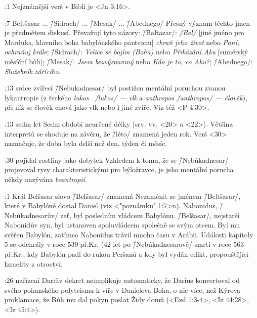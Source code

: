 

:1 {} Nejznámější verš v Bibli je <Jn 3:16>.  

:7  {Beltšasar ... \v/Sidrach/ ... \v/Mesak/ ... \v/Abednego/}
     Přesný význam těchto jmen je předmětem diskusí. Převažují tyto názory: 
     \v/Baltazar/: {\it \v/Bel/} [jiné jméno pro Marduka, hlavního boha babylónského panteonu]
     {\em chraň jeho život} nebo {\em Paní, ochraňuj krále}; 
     \v/Sidrach/: {\em Velice se bojím (Boha)} nebo {\em Přikázání Aku} [sumérský měsíční bůh];
     \v/Mesak/:   {\em Jsem bezvýznamný} nebo {\em Kdo je to, co Aku?};
     \v/Abednego/: {\em Služebník zářícího.}

:13 {srdce zvířecí}
     \v/Nebukadnesar/  byl postižen mentální poruchou zvanou lykantropie 
     (z řeckého {\em lukos \ {\v/lukos/} --- vlk} a {\em anthropos {\v/anthropos/} --- člověk}), 
     při níž  se člověk chová jako vlk nebo i jiné zvíře. Viz též <P 4:30>. 

:13 {sedm let} 
     Sedm období neurčené délky (srv. vv. <20> a <22>). Většina interpretů se shoduje na závěru, že 
     \v/léto/ znamená jeden rok. Verš <30> naznačuje, že doba byla delší než den, týden či měsíc.

:30 {pojídal rostliny jako dobytek}
     Vzhledem k tomu, že  se \v/Nebúkadnesar/ projevoval rysy charakteristickými pro býložravce,
     je jeho mentální porucha někdy nazývána {\it boantropií.\/}

:1 {Král Belšasar}
     slovo \v/Belšasar/ znamená  
     Nezaměnit se jménem \v/Beltšasar/, které v Babylóně dostal Daniel (viz <"poznámku" 1:7>n). 
     Nabonidus, \v/Nebúkadnesarův/ zeť, byl posledním vládcem Babylónu. 
     \v/Belšasar/, nejstarší Nabonidův syn, byl ustanoven spoluvládcem společně se svým otcem.
     Byl mu svěřen Babylón, zatímco Nabonidus trávil mnoho času v Arábii.
     Události kapitoly 5 se odehrály v roce 539 př.Kr. (42 let po \v/Nebúkadnesarově/
     smrti v roce 563 př.Kr., kdy Babylón padl do rukou Peršanů a kdy byl vydán
     edikt, propouštějící Izraelity z otroctví. 

:26 {nařízení} 
     Dariův dekret neimplikuje automaticky, že Darius konvertoval od svého
     pohanského polyteismu k víře v Danielova Boha, o nic více, než Kýrova proklamace, že Bůh mu
     dal pokyn poslat Židy domů (<Ezd 1:3-4>, <Iz 44:28>, <Iz 45:4>).

